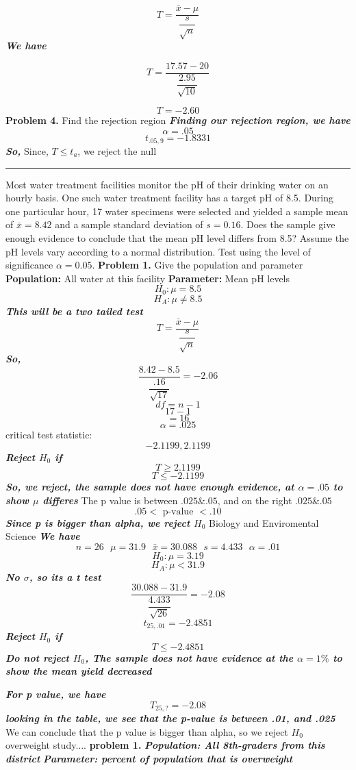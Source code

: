 \documentclass{report}
\begin{document}
$$ T = \dfrac{\bar{x} - \mu}{\dfrac{s}{\sqrt{n}}}$$
\textit{\textbf{We have}}

$$ T = \dfrac{17.57 - 20}{\dfrac{2.95}{\sqrt{10}}}$$

$$ T = -2.60$$
\textbf{Problem 4.} Find the rejection region
\bigbreak \noindent
\textit{\textbf{Finding our rejection region, we have}}
$$ \alpha = .05$$
$$ t_{.05,9} = -1.8331$$
\textit{\textbf{So,}}
\bigbreak \noindent
Since, $T \leq t_a$, we reject the null
\bigbreak\noindent
\hrule
\bigbreak \noindent
\q
Most water treatment facilities monitor the pH of their drinking water on an hourly basis. One such water treatment facility has a target pH of 8.5. During one particular hour, 17 water specimens were selected and yielded a sample mean of $\bar{x} = 8.42$ and a sample standard deviation of $s = 0.16$. Does the sample give enough evidence to conclude that the mean pH level differs from 8.5? Assume the pH levels vary according to a normal distribution. Test using the level of significance $\alpha = 0.05$.
\bigbreak \noindent
\textbf{Problem 1.} Give the population and parameter
\bigbreak \noindent
\textbf{Population:} All water at this facility
\bigbreak \noindent
\textbf{Parameter: } Mean pH levels
\bigbreak \noindent 
$$ H_0 : \mu = 8.5$$
$$ H_A : \mu \neq 8.5$$
\textit{\textbf{This will be a two tailed test}}
\bigbreak \noindent
$$ T = \dfrac{\bar{x}-\mu}{\dfrac{s}{\sqrt{n}}}$$
\textit{\textbf{So,}}
$$\dfrac{8.42 - 8.5}{\dfrac{.16}{\sqrt{17}}} = -2.06$$
\bigbreak \noindent
$$ df = n -1$$
$$ 17 -1$$ 
$$ = 16$$
$$\alpha = .025$$
critical test statistic:
$$-2.1199, 2.1199$$
\textit{\textbf{Reject $H_0$ if}}
$$ T \geq 2.1199$$
$$ T \leq -2.1199$$
\textit{\textbf{So, we reject, the sample does not have enough evidence, at $\alpha = .05$ to show $\mu$ differes }}
\bigbreak \noindent
The p value is between $.025 \& .05$, and on the right $.025 \& .05$
$$ .05 < \text{ p-value } < .10$$
\textit{\textbf{Since p is bigger than alpha, we reject $H_0$}}
\q
Biology and Enviromental Science
\bigbreak \noindent 
\textit{\textbf{We have}}
$$ n = 26 \ \ \ \mu = 31.9 \ \ \ \bar{x} = 30.088 \ \ \ s = 4.433 \ \ \ \alpha = .01$$
$$ H_0 : \mu = 3.19$$
$$ H_A : \mu < 31.9$$
\textit{\textbf{No $\sigma$, so its a t test}}
$$ \dfrac{30.088 - 31.9}{\dfrac{4.433}{\sqrt{26}}} = -2.08$$
$$ t_{25, .01} = -2.4851$$
\textit{\textbf{Reject $H_0$ if}}
$$ T \leq -2.4851$$
\textit{\textbf{Do not reject $H_0$, The sample does not have evidence at the $\alpha = 1\%$ to show the mean yield decreased}}

\noindent \textit{\textbf{For p value, we have}}
$$ T_{25, ?} = -2.08$$
\textit{\textbf{looking in the table, we see that the p-value is between .01, and .025}}
\bigbreak \noindent
We can conclude that the p value is bigger than alpha, so we reject $H_0$
\q
overweight study....
\bigbreak \noindent
\textbf{problem 1.} 
\bigbreak \noindent
\textit{\textbf{Population: All 8th-graders from this district}}
\bigbreak \noindent
\textit{\textbf{Parameter: percent of population that is overweight }}
\end{document}
